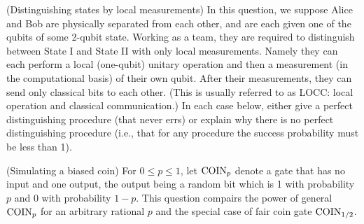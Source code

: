 \begin{questions}
  \question (Distinguishing states by local measurements) In this
  question, we suppose Alice and Bob are physically separated from
  each other, and are each given one of the qubits of some 2-qubit
  state. Working as a team, they are required to distinguish between
  State I and State II with only local measurements. Namely they can
  each perform a local (one-qubit) unitary operation and then a
  measurement (in the computational basis) of their own qubit. After
  their measurements, they can send only classical bits to each
  other. (This is usually referred to as LOCC: local operation and
  classical communication.)  In each case below, either give a perfect
  distinguishing procedure (that never errs) or explain why there is
  no perfect distinguishing procedure (i.e., that for any procedure
  the success probability must be less than 1).


  
  \question (Simulating a biased coin) For $0 \leq p \leq 1$, let
  $\mathrm{COIN}_p$ denote a gate that has no input and one output, the output
  being a random bit which is 1 with probability $p$ and 0 with
  probability $1- p$. This question compairs the power of general
  $\mathrm{COIN}_p$ for an arbitrary rational $p$ and the special case of
  fair coin gate $\mathrm{COIN}_{1/2}$.
\end{questions}
